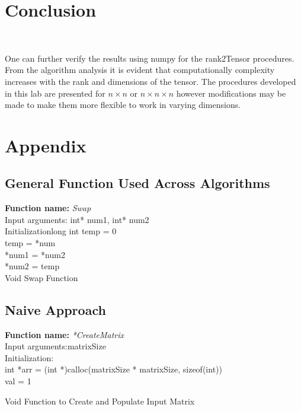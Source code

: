 \documentclass[10pt,journal]{article}
\begin{document}
\section{Conclusion}\

\justify
One can further verify the results using numpy for the rank2Tensor procedures. From the algorithm analysis it is evident that computationally complexity increases with the rank and dimensions of the tensor. The procedures developed in this lab are presented for $n\times n$ or $n\times n\times n$ however modifications may be made to make them more flexible to work in varying dimensions.



\appendix
\newpage
\section{Appendix}
\subsection{General Function Used Across Algorithms}
\begin{algorithm}[H]
\SetAlgoLined
\textbf{Function name:} \emph{Swap}\\
Input arguments:\: int* num1, int* num2\\

\vspace{10pt} 
Initialization\:long int temp = 0\\
     temp = *num\\
    *num1 = *num2\\
    *num2 = temp\\

\caption{Void Swap Function}
\end{algorithm}


\subsection{Naive Approach}
\begin{algorithm}[H]
\SetAlgoLined
\textbf{Function name:} \emph{*CreateMatrix}\\
Input arguments:\:matrixSize\\

Initialization\::\\ 
 int *arr = (int *)calloc(matrixSize * matrixSize, sizeof(int))\\
 val = 1
 
\vspace{10pt} 

\caption{Void Function to Create and Populate Input Matrix}
\end{algorithm}
\end{document}

